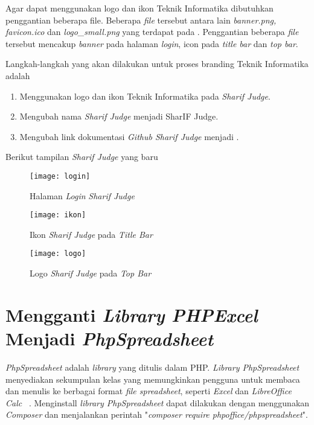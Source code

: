 Agar dapat menggunakan logo dan ikon Teknik Informatika dibutuhkan penggantian beberapa file. Beberapa \textit{file} tersebut antara lain \textit{banner.png, favicon.ico} dan \textit{logo\_small.png} yang terdapat pada . Penggantian beberapa \textit{file} tersebut mencakup \textit{banner} pada halaman \textit{login}, icon pada \textit{title bar} dan \textit{top bar}.

Langkah-langkah yang akan dilakukan untuk proses branding Teknik Informatika adalah
\begin{enumerate}
	\item Menggunakan logo dan ikon Teknik Informatika pada \textit{Sharif Judge}.
	\item Mengubah nama \textit{Sharif Judge} menjadi SharIF Judge.
	\item Mengubah link dokumentasi \textit{Github Sharif Judge} menjadi .
\end{enumerate}

Berikut tampilan \textit{Sharif Judge} yang baru
\begin{figure}[H]
	\centering  
	\texttt{[image: login]}  
	\caption[Halaman \textit{Login} \textit{Sharif Judge}]{Halaman \textit{Login} \textit{Sharif Judge}} 
	\label{fig:login} 
\end{figure}

\begin{figure}[H]
	\centering  
	\texttt{[image: ikon]}  
	\caption[Ikon \textit{Sharif Judge} pada \textit{Title Bar}]{Ikon \textit{Sharif Judge} pada \textit{Title Bar}} 
	\label{fig:ikon} 
\end{figure} 

\begin{figure}[H]
	\centering  
	\texttt{[image: logo]}  
	\caption[Logo \textit{Sharif Judge} pada \textit{Top Bar}]{Logo \textit{Sharif Judge} pada \textit{Top Bar}} 
	\label{fig:logo} 
\end{figure} 

\section{Mengganti \textit{Library PHPExcel} Menjadi \textit{PhpSpreadsheet}}
\textit{PhpSpreadsheet} adalah \textit{library} yang ditulis dalam PHP. \textit{Library PhpSpreadsheet} menyediakan sekumpulan kelas yang memungkinkan pengguna untuk membaca dan menulis ke berbagai format \textit{file spreadsheet}, seperti \textit{Excel} dan \textit{LibreOffice Calc} ~\cite{phpoffice:10:phpspreadsheet}. Menginstall \textit{library PhpSpreadsheet} dapat dilakukan dengan menggunakan \textit{Composer} dan menjalankan perintah "\textit{composer require phpoffice/phpspreadsheet}".

